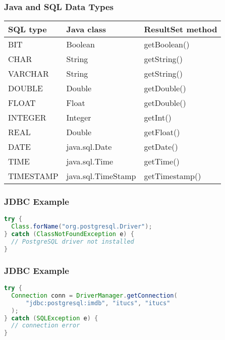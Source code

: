 \documentclass[dvipsnames]{beamer}
\theoremstyle{plain}
\begin{document}
\begin{frame}
  \frametitle{Java and SQL Data Types}

  \begin{table}
    \begin{tabular}{|l|l|l|}\hline
SQL type  & Java class         & ResultSet method\\\hline\hline
BIT       & Boolean            & getBoolean()    \\\hline
CHAR      & String             & getString()     \\\hline
VARCHAR   & String             & getString()     \\\hline
DOUBLE    & Double             & getDouble()     \\\hline
FLOAT     & Float              & getDouble()     \\\hline
INTEGER   & Integer            & getInt()        \\\hline
REAL      & Double             & getFloat()      \\\hline
DATE      & java.sql.Date      & getDate()       \\\hline
TIME      & java.sql.Time      & getTime()       \\\hline
TIMESTAMP & java.sql.TimeStamp & getTimestamp()  \\\hline
    \end{tabular}
  \end{table}
\end{frame}

\begin{frame}[fragile]
  \frametitle{JDBC Example}

  \begin{example}
    \begin{lstlisting}[language=Java]
try {
  Class.forName("org.postgresql.Driver");
} catch (ClassNotFoundException e) {
  // PostgreSQL driver not installed
}
    \end{lstlisting}
  \end{example}
\end{frame}

\begin{frame}[fragile]
  \frametitle{JDBC Example}

  \begin{example}[connecting]
    \begin{lstlisting}[language=Java]
try {
  Connection conn = DriverManager.getConnection(
      "jdbc:postgresql:imdb", "itucs", "itucs"
  );
} catch (SQLException e) {
  // connection error
}
    \end{lstlisting}
  \end{example}
\end{frame}
\end{document}
